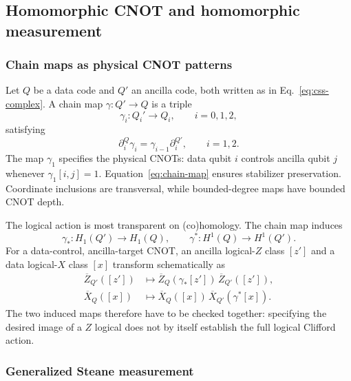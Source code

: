 \documentclass[11pt]{article}
\begin{document}
\subsection{Homomorphic CNOT and homomorphic measurement}

\subsubsection{Chain maps as physical CNOT patterns}

Let $Q$ be a data code and $Q'$ an ancilla code, both written as in
Eq.~\eqref{eq:css-complex}. A chain map $\gamma:Q'\to Q$ is a triple
\begin{equation}
  \gamma_i:Q_i'\longrightarrow Q_i,
  \qquad i=0,1,2,
  \label{eq:chain-map-components}
\end{equation}
satisfying
\begin{equation}
  \partial_i^Q\gamma_i
  =\gamma_{i-1}\partial_i^{Q'},
  \qquad i=1,2.
  \label{eq:chain-map}
\end{equation}
The map $\gamma_1$ specifies the physical CNOTs: data qubit $i$ controls
ancilla qubit $j$ whenever $\gamma_1[i,j]=1$. Equation~\eqref{eq:chain-map}
ensures stabilizer preservation. Coordinate inclusions are transversal, while
bounded-degree maps have bounded CNOT depth.

The logical action is most transparent on (co)homology. The chain map induces
\begin{equation}
  \gamma_*:H_1(Q')\longrightarrow H_1(Q),
  \qquad
  \gamma^*:H^1(Q)\longrightarrow H^1(Q').
  \label{eq:induced-maps}
\end{equation}
For a data-control, ancilla-target CNOT, an ancilla logical-$Z$ class $[z']$
and a data logical-$X$ class $[x]$ transform schematically as
\begin{align}
  \overline Z_{Q'}([z'])
  &\longmapsto
  \overline Z_Q(\gamma_*[z'])\,\overline Z_{Q'}([z']),
  \label{eq:z-action}\\
  \overline X_Q([x])
  &\longmapsto
  \overline X_Q([x])\,\overline X_{Q'}(\gamma^*[x]).
  \label{eq:x-action}
\end{align}
The two induced maps therefore have to be checked together: specifying the
desired image of a $Z$ logical does not by itself establish the full logical
Clifford action.

\subsubsection{Generalized Steane measurement}
\end{document}

